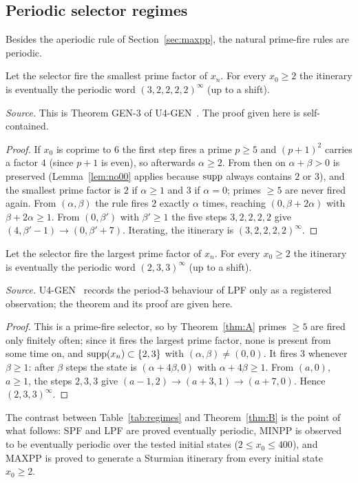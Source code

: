 \subsection{Periodic selector regimes}
Besides the aperiodic rule of Section~\ref{sec:maxpp}, the natural prime-fire rules are periodic.
\begin{theorem}\label{thm:spf}
Let the selector fire the smallest prime factor of $x_n$. For every $x_0\ge2$ the itinerary is eventually the periodic word $(3,2,2,2,2)^\infty$ (up to a shift).
\end{theorem}
\noindent\emph{Source.} This is Theorem GEN-3 of U4-GEN~\cite{u4gen}. The proof given here is self-contained.
\begin{proof}
If $x_0$ is coprime to $6$ the first step fires a prime $p\ge5$ and $(p+1)^2$ carries a factor $4$ (since $p+1$ is even), so afterwards $\alpha\ge2$. From then on $\alpha+\beta>0$ is preserved (Lemma~\ref{lem:no00} applies because $\operatorname{supp}$ always contains $2$ or $3$), and the smallest prime factor is $2$ if $\alpha\ge1$ and $3$ if $\alpha=0$; primes $\ge5$ are never fired again. From $(\alpha,\beta)$ the rule fires $2$ exactly $\alpha$ times, reaching $(0,\beta+2\alpha)$ with $\beta+2\alpha\ge1$. From $(0,\beta')$ with $\beta'\ge1$ the five steps $3,2,2,2,2$ give $(4,\beta'-1)\to(0,\beta'+7)$. Iterating, the itinerary is $(3,2,2,2,2)^\infty$. \end{proof}
\begin{theorem}\label{thm:lpf}
Let the selector fire the largest prime factor of $x_n$. For every $x_0\ge2$ the itinerary is eventually the periodic word $(2,3,3)^\infty$ (up to a shift).
\end{theorem}
\noindent\emph{Source.} U4-GEN~\cite{u4gen} records the period-$3$ behaviour of \textsf{LPF} only as a registered observation; the theorem and its proof are given here.
\begin{proof}
This is a prime-fire selector, so by Theorem~\ref{thm:A} primes $\ge5$ are fired only finitely often; since it fires the largest prime factor, none is present from some time on, and $\operatorname{supp}(x_n)\subset\{2,3\}$ with $(\alpha,\beta)\ne(0,0)$. It fires $3$ whenever $\beta\ge1$: after $\beta$ steps the state is $(\alpha+4\beta,0)$ with $\alpha+4\beta\ge1$. From $(a,0)$, $a\ge1$, the steps $2,3,3$ give $(a-1,2)\to(a+3,1)\to(a+7,0)$. Hence $(2,3,3)^\infty$. \end{proof}
\begin{table}[ht]\centering\small
\resizebox{\textwidth}{!}{}
\caption{The four elementary prime-fire rules. SPF and LPF are eventually periodic and are covered by Theorems~\ref{thm:spf}, \ref{thm:lpf}; the MINPP column is a computation, not a theorem; \textsf{MAXPP} is the subject of Sections~\ref{sec:maxpp}--\ref{sec:freq}.}\label{tab:regimes}\end{table}
The contrast between Table~\ref{tab:regimes} and Theorem~\ref{thm:B} is the point of what follows: \textsf{SPF} and \textsf{LPF} are proved eventually periodic, \textsf{MINPP} is observed to be eventually periodic over the tested initial states ($2\le x_0\le400$), and \textsf{MAXPP} is proved to generate a Sturmian itinerary from every initial state $x_0\ge2$.

